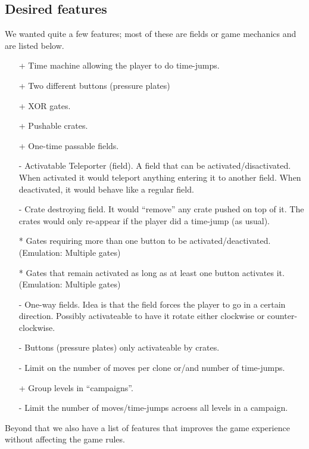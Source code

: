 \subsection{Desired features}
We wanted quite a few features; most of these are fields or game
mechanics and are listed below.

\begin{itemize}
\item[+] Time machine allowing the player to do time-jumps.
\item[+] Two different buttons (pressure plates)
\item[+] XOR gates.
\item[+] Pushable crates.
\item[+] One-time passable fields.
\item[-] Activatable Teleporter (field).  A field that can be
  activated/disactivated.  When activated it would teleport anything
  entering it to another field.  When deactivated, it would behave
  like a regular field.
\item[-] Crate destroying field.  It would ``remove'' any crate pushed
  on top of it.  The crates would only re-appear if the player did a
  time-jump (as usual).
\item[*] Gates requiring more than one button to be activated/deactivated.
 (Emulation: Multiple gates)
\item[*] Gates that remain activated as long as at least one button activates
 it.  (Emulation: Multiple gates)
\item[-] One-way fields.  Idea is that the field forces the player to go
 in a certain direction.  Possibly activateable to have it rotate either
 clockwise or counter-clockwise.
\item[-] Buttons (pressure plates) only activateable by crates.
\item[-] Limit on the number of moves per clone or/and number of time-jumps.
\item[+] Group levels in ``campaigns''.
\item[-] Limit the number of moves/time-jumps acroess all levels in a campaign.
\end{itemize}

Beyond that we also have a list of features that improves the game
experience without affecting the game rules.

